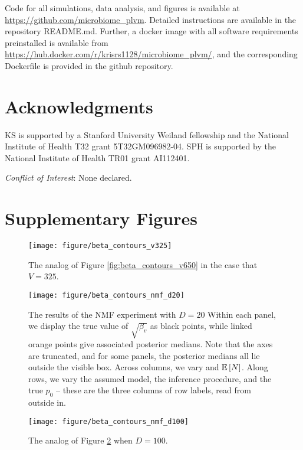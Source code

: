 \documentclass{article}
\begin{document}
Code for all simulations, data analysis, and figures is available at
\url{https://github.com/microbiome\_plvm}. Detailed instructions are available
in the repository README.md. Further, a docker image with all software
requirements preinstalled is available from
\url{https://hub.docker.com/r/krisrs1128/microbiome_plvm/}, and the
corresponding Dockerfile is provided in the github repository.

\section*{Acknowledgments}

KS is supported by a Stanford University Weiland fellowship and the National
Institute of Health T32 grant 5T32GM096982-04. SPH is supported by the National
Institute of Health TR01 grant AI112401.

{\it Conflict of Interest}: None declared.




\section{Supplementary Figures}

\begin{figure}[!p]
  \centering
  \texttt{[image: figure/beta\_contours\_v325]}
  \caption{The analog of Figure \ref{fig:beta_contours_v650} in the case that $V
    = 325$. \label{fig:beta_contours_v325}}
\end{figure}

\begin{figure}[!p]
  \centering
  \texttt{[image: figure/beta\_contours\_nmf\_d20]}
  \caption{The results of the NMF experiment with $D = 20$ Within each panel, we
    display the true value of $\sqrt{\beta_{v}}$ as black points, while linked
    orange points give associated posterior medians. Note that the axes are
    truncated, and for some panels, the posterior medians all lie outside the
    visible box. Across columns, we vary and $\mathbb{E}\left[{N}\right]$. Along rows, we vary the
    assumed model, the inference procedure, and the true $p_{0}$ -- these are
    the three columns of row labels, read from outside
    in.\label{fig:beta_contours_nmf_d20}}
\end{figure}

\begin{figure}[!p]
  \centering
  \texttt{[image: figure/beta\_contours\_nmf\_d100]}
  \caption{The analog of Figure \ref{fig:beta_contours_nmf_d20} when $D = 100$.
  \label{fig:beta_contours_nmf_d100}}
\end{figure}
\end{document}
